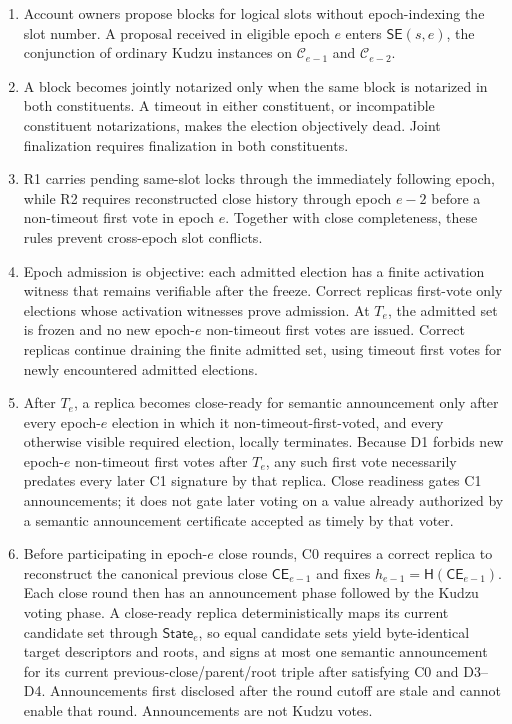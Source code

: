 \documentclass[11pt]{article}
\theoremstyle{definition}
\theoremstyle{remark}
\newcommand{\C}{\mathcal C}
\newcommand{\SE}{\mathsf{SE}}
\newcommand{\CE}{\mathsf{CE}}
\newcommand{\State}{\mathsf{State}}
\newcommand{\hash}{\mathsf{H}}
\begin{document}
\begin{enumerate}[leftmargin=2.0em]
  \item Account owners propose blocks for logical slots without epoch-indexing the slot number. A proposal received in eligible epoch $e$ enters $\SE(s,e)$, the conjunction of ordinary Kudzu instances on $\C_{e-1}$ and $\C_{e-2}$.

  \item A block becomes jointly notarized only when the same block is notarized in both constituents. A timeout in either constituent, or incompatible constituent notarizations, makes the election objectively dead. Joint finalization requires finalization in both constituents.

  \item R1 carries pending same-slot locks through the immediately following epoch, while R2 requires reconstructed close history through epoch $e-2$ before a non-timeout first vote in epoch $e$. Together with close completeness, these rules prevent cross-epoch slot conflicts.

  \item Epoch admission is objective: each admitted election has a finite activation witness that remains verifiable after the freeze. Correct replicas first-vote only elections whose activation witnesses prove admission. At $T_e$, the admitted set is frozen and no new epoch-$e$ non-timeout first votes are issued. Correct replicas continue draining the finite admitted set, using timeout first votes for newly encountered admitted elections.

  \item After $T_e$, a replica becomes close-ready for semantic announcement only after every epoch-$e$ election in which it non-timeout-first-voted, and every otherwise visible required election, locally terminates. Because D1 forbids new epoch-$e$ non-timeout first votes after $T_e$, any such first vote necessarily predates every later C1 signature by that replica. Close readiness gates C1 announcements; it does not gate later voting on a value already authorized by a semantic announcement certificate accepted as timely by that voter.

  \item Before participating in epoch-$e$ close rounds, C0 requires a correct replica to reconstruct the canonical previous close $\CE_{e-1}$ and fixes $h_{e-1}=\hash(\CE_{e-1})$. Each close round then has an announcement phase followed by the Kudzu voting phase. A close-ready replica deterministically maps its current candidate set through $\State_e$, so equal candidate sets yield byte-identical target descriptors and roots, and signs at most one semantic announcement for its current previous-close/parent/root triple after satisfying C0 and D3--D4. Announcements first disclosed after the round cutoff are stale and cannot enable that round. Announcements are not Kudzu votes.


\end{enumerate}
\end{document}
